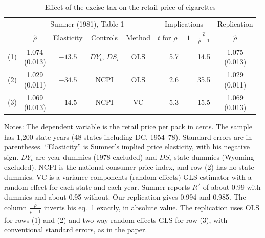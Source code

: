 \begin{table}[htbp]
\centering
\begin{threeparttable}
\caption{Effect of the excise tax on the retail price of cigarettes}
\label{tab:03-sumner}
\small
\begin{tabular}{@{}lccccccc@{}}
\toprule
& \multicolumn{4}{c}{Sumner (1981), Table 1} & \multicolumn{2}{c}{Implications} & Replication \\
\cmidrule(lr){2-5}\cmidrule(lr){6-7}\cmidrule(l){8-8}
& $\hat\rho$ & Elasticity & Controls & Method & $t$ for $\rho = 1$ & $\frac{\hat\rho}{\hat\rho - 1}$ &
  $\hat\rho$ \\
\midrule
(1) & \makecell{1.074\\(0.013)} & $-13.5$ & $DY_t$, $DS_i$ & OLS & 5.7 & 14.5 & \makecell{1.075\\(0.013)} \\
\addlinespace
(2) & \makecell{1.029\\(0.011)} & $-34.5$ & NCPI & OLS & 2.6 & 35.5 & \makecell{1.029\\(0.011)} \\
\addlinespace
(3) & \makecell{1.069\\(0.013)} & $-14.5$ & NCPI & VC & 5.3 & 15.5 & \makecell{1.069\\(0.013)} \\
\bottomrule
\end{tabular}
\begin{tablenotes}\footnotesize
\item Notes: The dependent variable is the retail price per pack in cents. The sample has 1,200 state-years (48 states
including DC, 1954--78). Standard errors are in parentheses. ``Elasticity'' is Sumner's implied price elasticity, with his negative sign.
$DY_t$ are year dummies (1978 excluded) and $DS_i$ state dummies (Wyoming excluded). NCPI is the national consumer
price index, and row (2) has no state dummies. VC is a variance-components (random-effects) GLS estimator with a random
effect for each state and each year. Sumner reports $R^2$ of about 0.99 with dummies and about 0.95 without. Our
replication gives 0.994 and 0.985. The column $\frac{\hat\rho}{\hat\rho - 1}$ inverts his eq.~1 exactly, in absolute
value. The replication uses OLS for rows (1) and (2) and two-way random-effects GLS for row (3), with conventional
standard errors, as in the paper.
\end{tablenotes}
\end{threeparttable}
\end{table}

